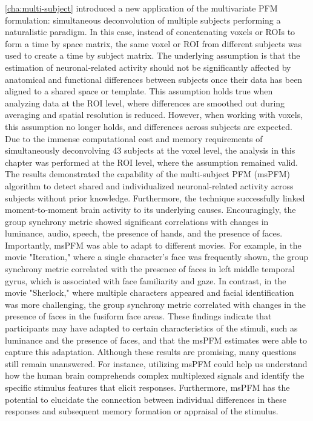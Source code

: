 \cref{cha:multi-subject}
introduced a new application of the multivariate PFM formulation: simultaneous
deconvolution of multiple subjects performing a naturalistic paradigm. In this
case, instead of concatenating voxels or ROIs to form a time by space matrix,
the same voxel or ROI from different subjects was used to create a time by
subject matrix. The underlying assumption is that the estimation of
neuronal-related activity should not be significantly affected by anatomical and
functional differences between subjects once their data has been aligned to a
shared space or template. This assumption holds true when analyzing data at the
ROI level, where differences are smoothed out during averaging and spatial
resolution is reduced. However, when working with voxels, this assumption no
longer holds, and differences across subjects are expected. Due to the immense
computational cost and memory requirements of simultaneously deconvolving 43
subjects at the voxel level, the analysis in this chapter was performed at the
ROI level, where the assumption remained valid. The results demonstrated the
capability of the multi-subject PFM (msPFM) algorithm to detect shared and
individualized neuronal-related activity across subjects without prior
knowledge. Furthermore, the technique successfully linked moment-to-moment brain
activity to its underlying causes. Encouragingly, the group synchrony metric
showed significant correlations with changes in luminance, audio, speech, the
presence of hands, and the presence of faces. Importantly, msPFM was
able to adapt to different movies. For example, in the movie "Iteration," where
a single character's face was frequently shown, the group synchrony metric
correlated with the presence of faces in left middle temporal gyrus, which is
associated with face familiarity and gaze. In contrast, in the movie "Sherlock,"
where multiple characters appeared and facial identification was more
challenging, the group synchrony metric correlated with changes in the presence
of faces in the fusiform face areas. These findings indicate that participants
may have adapted to certain characteristics of the stimuli, such as luminance
and the presence of faces, and that the msPFM estimates were able to capture
this adaptation. Although these results are promising, many questions still
remain unanswered. For instance, utilizing msPFM could help us understand how
the human brain comprehends complex multiplexed signals and identify the
specific stimulus features that elicit responses. Furthermore, msPFM has the
potential to elucidate the connection between individual differences in these
responses and subsequent memory formation or appraisal of the stimulus.

